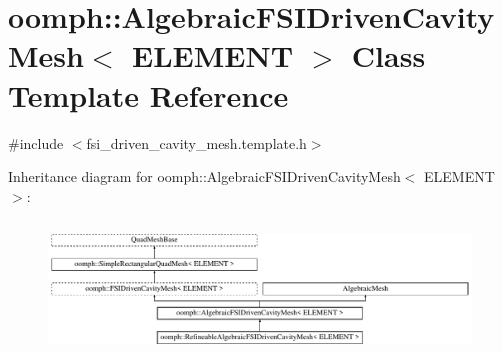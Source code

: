 \hypertarget{classoomph_1_1AlgebraicFSIDrivenCavityMesh}{}\section{oomph\+:\+:Algebraic\+F\+S\+I\+Driven\+Cavity\+Mesh$<$ E\+L\+E\+M\+E\+NT $>$ Class Template Reference}
\label{classoomph_1_1AlgebraicFSIDrivenCavityMesh}


{\ttfamily \#include $<$fsi\+\_\+driven\+\_\+cavity\+\_\+mesh.\+template.\+h$>$}

Inheritance diagram for oomph\+:\+:Algebraic\+F\+S\+I\+Driven\+Cavity\+Mesh$<$ E\+L\+E\+M\+E\+NT $>$\+:\begin{figure}[H]
\begin{center}
\leavevmode
\includegraphics[height=3.645833cm]{classoomph_1_1AlgebraicFSIDrivenCavityMesh}
\end{center}
\end{figure}
